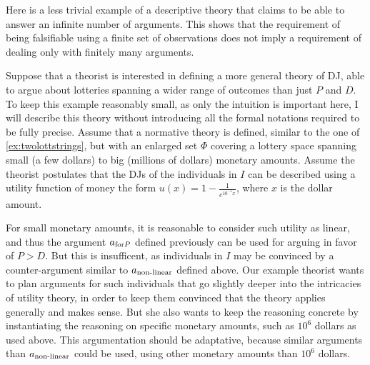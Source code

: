 \documentclass[version=last, pagesize, twoside=off, bibliography=totoc, DIV=calc, fontsize=12pt, a4paper, french, english]{scrartcl}
\begin{document}
Here is a less trivial example of a descriptive theory that claims to be able to answer an infinite number of arguments. This shows that the requirement of being falsifiable using a finite set of observations does not imply a requirement of dealing only with finitely many arguments.
\begin{example}
	\label{ex:infinite}
	Suppose that a theorist is interested in defining a more general theory of \ac{DJ}, able to argue about lotteries spanning a wider range of outcomes than just $P$ and $D$. To keep this example reasonably small, as only the intuition is important here, I will describe this theory without introducing all the formal notations required to be fully precise. Assume that a normative theory is defined, similar to the one of \cref{ex:twolottstrings}, but with an enlarged set $\Phi$ covering a lottery space spanning small (a few dollars) to big (millions of dollars) monetary amounts. Assume the theorist postulates that the \acp{DJ} of the individuals in $I$ can be described using a utility function of money the form $u(x) = 1 - \frac{1}{e^{10^{-5}x}}$, where $x$ is the dollar amount.
	
	For small monetary amounts, it is reasonable to consider such utility as linear, and thus the argument $\ar_\text{for$P$}$ defined previously can be used for arguing in favor of $P > D$. But this is insufficent, as individuals in $I$ may be convinced by a counter-argument similar to $\ar_\text{non-linear}$ defined above. Our example theorist wants to plan arguments for such individuals that go slightly deeper into the intricacies of utility theory, in order to keep them convinced that the theory applies generally and makes sense. But she also wants to keep the reasoning concrete by instantiating the reasoning on specific monetary amounts, such as $10^6$ dollars as used above. This argumentation should be adaptative, because similar arguments than $\ar_\text{non-linear}$ could be used, using other monetary amounts than $10^6$ dollars.


\end{example}
\end{document}
